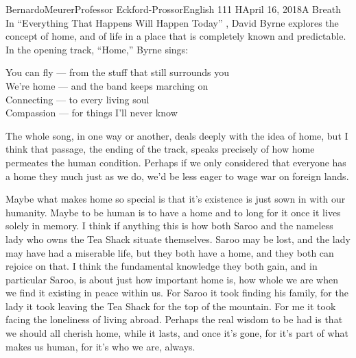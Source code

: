 \documentclass[12pt,letterpaper]{article}
\begin{document}
\begin{mla}{Bernardo}{Meurer}{Professor Eckford-Prossor}{English 111 H}{April 16, 2018}{A Breath}
	In ``Everything That Happens Will Happen Today'' \autocite{byrne_2008}, David Byrne explores the concept of home, and of life in a place that is completely known and predictable. In the opening track, ``Home,'' Byrne sings:
	\begin{blocks}
		You can fly --- from the stuff that still surrounds you\\
		We're home --- and the band keeps marching on\\
		Connecting --- to every living soul\\
		Compassion --- for things I'll never know\\
	\end{blocks}
	The whole song, in one way or another, deals deeply with the idea of home, but I think that passage, the ending of the track, speaks precisely of how home permeates the human condition. Perhaps if we only considered that everyone has a home they much just as we do, we'd be less eager to wage war on foreign lands.

	Maybe what makes home so special is that it's existence is just sown in with our humanity. Maybe to be human is to have a home and to long for it once it lives solely in memory. I think if anything this is how both Saroo and the nameless lady who owns the Tea Shack situate themselves. Saroo may be lost, and the lady may have had a miserable life, but they both have a home, and they both can rejoice on that. I think the fundamental knowledge they both gain, and in particular Saroo, is about just how important home is, how whole we are when we find it existing in peace within us. For Saroo it took finding his family, for the lady it took leaving the Tea Shack for the top of the mountain. For me it took facing the loneliness of living abroad. Perhaps the real wisdom to be had is that we should all cherish home, while it lasts, and once it's gone, for it's part of what makes us human, for it's who we are, always.
	\newpage
	\printbibliography%
	\newpage

\end{mla}
\end{document}
